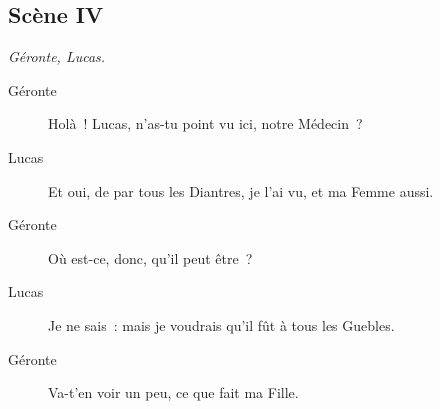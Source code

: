 \documentclass[french,twoside]{book} %
\begin{document}
\subsection[{Scène IV}]{Scène IV}
\label{III04}
\textit{Géronte, Lucas.}\par
 \begin{description} \item[Géronte] 

Holà ! Lucas, n’as-tu point vu ici, notre Médecin ?\end{description}
 \begin{description} \item[Lucas] 

Et oui, de par tous les Diantres, je l’ai vu, et ma Femme aussi.\end{description}
 \begin{description} \item[Géronte] 

Où est-ce, donc, qu’il peut être ?\end{description}
 \begin{description} \item[Lucas] 

Je ne sais : mais je voudrais qu’il fût à tous les Guebles.\end{description}
 \begin{description} \item[Géronte] 

Va-t’en voir un peu, ce que fait ma Fille.\end{description}
\end{document}
